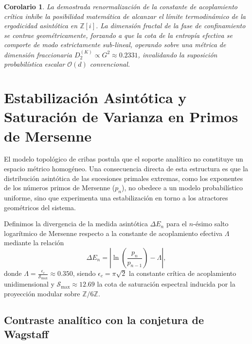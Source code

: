 \documentclass{article}
\numberwithin{equation}{section}
\theoremstyle{plain}
\newtheorem{corolario}[teorema]{Corolario}
\theoremstyle{definition}
\begin{document}
\begin{corolario}
La demostrada renormalización de la constante de acoplamiento crítica inhibe la posibilidad matemática de alcanzar el límite termodinámico de la ergodicidad asintótica en $\mathbb{Z}[i]$. La dimensión fractal de la fase de confinamiento se contrae geométricamente, forzando a que la cota de la entropía efectiva se comporte de modo estrictamente sub-lineal, operando sobre una métrica de dimensión fraccionaria $D_2^{(K)} \propto G^2 \approx 0.2331$, invalidando la suposición probabilística escalar $\mathcal{O}(d)$ convencional.
\end{corolario}

\section{Estabilización Asintótica y Saturación de Varianza en Primos de Mersenne}
\label{sec:cristalizacion_asintotica}

El modelo topológico de cribas postula que el soporte analítico no constituye un espacio métrico homogéneo. Una consecuencia directa de esta estructura es que la distribución asintótica de las sucesiones primales extremas, como los exponentes de los números primos de Mersenne ($p_n$), no obedece a un modelo probabilístico uniforme, sino que experimenta una estabilización en torno a los atractores geométricos del sistema.

Definimos la divergencia de la medida asintótica $\Delta E_n$ para el $n$-ésimo salto logarítmico de Mersenne respecto a la constante de acoplamiento efectiva $\Lambda$ mediante la relación
\begin{equation}
    \Delta E_n = \left\lvert \ln\left(\frac{p_n}{p_{n-1}}\right) - \Lambda \right\rvert,
\end{equation}
donde $\Lambda = \frac{\epsilon_c}{\mathcal{S}_{\max}} \approx 0.350$, siendo $\epsilon_c = \pi\sqrt{2}$ la constante crítica de acoplamiento unidimensional y $\mathcal{S}_{\max} \approx 12.69$ la cota de saturación espectral inducida por la proyección modular sobre $\mathbb{Z}/6\mathbb{Z}$.

\subsection{Contraste analítico con la conjetura de Wagstaff}
\end{document}
